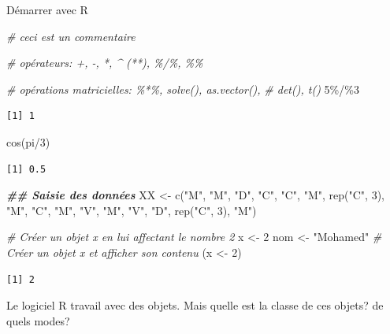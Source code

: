 \documentclass[
  8pt,
  ignorenonframetext,
]{beamer}
\newenvironment{Shaded}{\begin{snugshade}}{\end{snugshade}}
\newcommand{\CommentTok}[1]{\textcolor[rgb]{0.56,0.35,0.01}{\textit{#1}}}
\newcommand{\DecValTok}[1]{\textcolor[rgb]{0.00,0.00,0.81}{#1}}
\newcommand{\DocumentationTok}[1]{\textcolor[rgb]{0.56,0.35,0.01}{\textbf{\textit{#1}}}}
\newcommand{\FunctionTok}[1]{\textcolor[rgb]{0.00,0.00,0.00}{#1}}
\newcommand{\NormalTok}[1]{#1}
\newcommand{\OtherTok}[1]{\textcolor[rgb]{0.56,0.35,0.01}{#1}}
\newcommand{\SpecialCharTok}[1]{\textcolor[rgb]{0.00,0.00,0.00}{#1}}
\newcommand{\StringTok}[1]{\textcolor[rgb]{0.31,0.60,0.02}{#1}}
\begin{document}
\begin{frame}[fragile]{Démarrer avec R}
\protect\hypertarget{duxe9marrer-avec-r-1}{}
\begin{Shaded}
\begin{Highlighting}[]
\CommentTok{\# ceci est un commentaire}

\CommentTok{\# opérateurs: +, {-}, *, \^{} (**), \%/\%, \%\%}

\CommentTok{\# opérations matricielles: \%*\%, solve(), as.vector(),}
\CommentTok{\# det(), t()}
\DecValTok{5}\SpecialCharTok{\%/\%}\DecValTok{3}
\end{Highlighting}
\end{Shaded}

\begin{verbatim}
[1] 1
\end{verbatim}

\begin{Shaded}
\begin{Highlighting}[]
\FunctionTok{cos}\NormalTok{(pi}\SpecialCharTok{/}\DecValTok{3}\NormalTok{)}
\end{Highlighting}
\end{Shaded}

\begin{verbatim}
[1] 0.5
\end{verbatim}

\begin{Shaded}
\begin{Highlighting}[]
\DocumentationTok{\#\# Saisie des données}
\NormalTok{XX }\OtherTok{\textless{}{-}} \FunctionTok{c}\NormalTok{(}\StringTok{"M"}\NormalTok{, }\StringTok{"M"}\NormalTok{, }\StringTok{"D"}\NormalTok{, }\StringTok{"C"}\NormalTok{, }\StringTok{"C"}\NormalTok{, }\StringTok{"M"}\NormalTok{, }\FunctionTok{rep}\NormalTok{(}\StringTok{"C"}\NormalTok{, }\DecValTok{3}\NormalTok{), }\StringTok{"M"}\NormalTok{, }\StringTok{"C"}\NormalTok{,}
    \StringTok{"M"}\NormalTok{, }\StringTok{"V"}\NormalTok{, }\StringTok{"M"}\NormalTok{, }\StringTok{"V"}\NormalTok{, }\StringTok{"D"}\NormalTok{, }\FunctionTok{rep}\NormalTok{(}\StringTok{"C"}\NormalTok{, }\DecValTok{3}\NormalTok{), }\StringTok{"M"}\NormalTok{)}
\end{Highlighting}
\end{Shaded}
\end{frame}

\begin{frame}[fragile]
\begin{Shaded}
\begin{Highlighting}[]
\CommentTok{\# Créer un objet x en lui affectant le nombre 2}
\NormalTok{x }\OtherTok{\textless{}{-}} \DecValTok{2}
\NormalTok{nom }\OtherTok{\textless{}{-}} \StringTok{"Mohamed"}
\CommentTok{\# Créer un objet x et afficher son contenu}
\NormalTok{(x }\OtherTok{\textless{}{-}} \DecValTok{2}\NormalTok{)}
\end{Highlighting}
\end{Shaded}

\begin{verbatim}
[1] 2
\end{verbatim}

Le logiciel R travail avec des objets. Mais quelle est la classe de ces
objets? de quels modes?
\end{frame}
\end{document}
